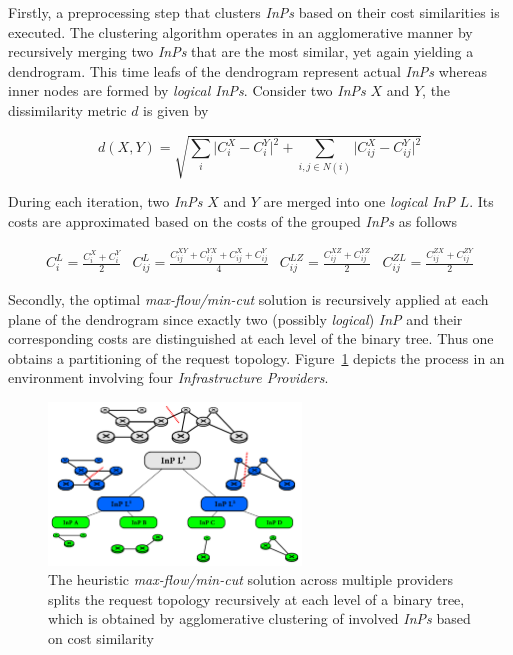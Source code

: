 \documentclass[prodmode,acmtomccap]{acmlarge}
\providecommand{\abs}[1]{\lvert#1\rvert}
\begin{document}
Firstly, a preprocessing step that clusters \emph{InPs} based on their cost similarities is executed. The clustering algorithm operates in an agglomerative manner by recursively merging two
\emph{InPs} that are the most similar, yet again yielding a dendrogram. This time leafs of the dendrogram represent actual \emph{InPs}
whereas inner nodes are formed by \emph{logical InPs}. Consider two \emph{InPs} $X$ and $Y$, the dissimilarity metric $d$ is given by

\normalsize

$$
 d(X,Y) = \sqrt{\sum\limits_{i} \abs{C_i^X - C_i^Y}^2 + \sum\limits_{i, j \in N(i)} \abs{C_{ij}^X - C_{ij}^Y}^2}
$$

\small

During each iteration, two \emph{InPs} $X$ and $Y$ are merged into one \emph{logical InP} $L$. Its costs are approximated based on the costs of the grouped \emph{InPs} as follows

\normalsize

$$
\begin{array}{cccc}
	C_i^L = \frac{C_i^X + C_i^Y}{2} & C_{ij}^{L} = \frac{C_{ij}^{XY} + C_{ij}^{YX} + C_{ij}^{X} + C_{ij}^{Y} }{4} & 
	C_{ij}^{LZ} = \frac{C_{ij}^{XZ} + C_{ij}^{YZ}}{2} & C_{ij}^{ZL} = \frac{C_{ij}^{ZX} + C_{ij}^{ZY}}{2} 
\end{array}
$$

\small

Secondly, the optimal \emph{max-flow/min-cut} solution is recursively applied at each plane of the dendrogram
since exactly two (possibly \emph{logical}) \emph{InP} and their corresponding costs are distinguished at each level of the binary tree. Thus one obtains a partitioning of the request topology.
Figure~\ref{fig6} depicts the process in an environment involving four \emph{Infrastructure Providers}. 

\begin{figure}[htb]
	\centering
	\includegraphics[width=0.6\textwidth]{recursive_heuristic}
	\caption{The heuristic \emph{max-flow/min-cut} solution across multiple providers splits the request topology recursively at each level of a binary tree, which is obtained 
		by agglomerative clustering of involved \emph{InPs} based on cost similarity}
	\label{fig6}
\end{figure}
\end{document}
